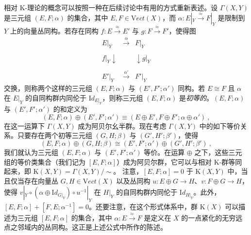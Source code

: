 \documentclass[11pt,a4paper]{ctexart}
\begin{document}
相对 K-理论的概念可以按照一种在后续讨论中有用的方式重新表述。设 \(\Gamma(X,Y)\) 是三元组 \((E,F;\alpha)\) 的集合，其中 \(E,F\in {\mathrm
Vect}(X)\)，而 \(\alpha: E|_{Y}\stackrel{\approx}{\rightarrow}F|_{Y}\) 是限制到 \(Y\) 上的向量丛同构。若存在同构 \(f: E\stackrel{\approx}{\rightarrow} E'\) 与 \(g:
F\stackrel{\approx}{\rightarrow}F'\)，使得图 \[{\begin{array}{ccc}
E|_{Y}&\stackrel{\alpha}{\longrightarrow}&F|_{Y}\\&
&\\{\scriptstyle f|_{Y}}\downarrow& &\downarrow{\scriptstyle g|_{Y}}\\&
&\\E'|_{Y}&\stackrel{\alpha'}{\longrightarrow}&F'|_{Y}\end{array}}\] 交换，则称两个这样的三元组 \((E,F;\alpha)\) 与 \((E',F';\alpha')\) 同构。若 \(E\cong F\) 且 \(\alpha\) 在 \(E|_{Y}\) 的自同构群内同伦于 \({\mathrm Id}_{E|_{Y}}\)，则称三元组 \((E,F;\alpha)\) 是\emph{初等的}。\((E,F;\alpha)\) 与 \((E',F';\alpha')\) 的和定义为 \[(E,F;\alpha)\oplus(E',F';\alpha')
\equiv(E\oplus E', F\oplus F'; \alpha\oplus\alpha')\ ,\] 在这一运算下 \(\Gamma(X,Y)\) 成为阿贝尔幺半群。现在考虑 \(\Gamma(X,Y)\) 中的如下等价关系。只要存在两个初等三元组 \((G,H;\beta)\) 与 \((G',H';\beta')\)，使得 \[(E,F;\alpha)\oplus(G,H;\beta)\cong(E',F';\alpha')\oplus(G',H';\beta')\ ,\] 我们就认为三元组 \((E,F;\alpha)\) 与 \((E',F';\alpha')\) 等价。在运算 \(\oplus\) 之下，这些三元组的等价类集合（我们记为 \([E,F;\alpha]\)）成为阿贝尔群，它可以与相对 K-群等同起来，即 \({\mathrm K}(X,Y)=\Gamma(X,Y)/\sim\)。 注意，\([E,F;\alpha]=0\) 于 \({\mathrm K}(X,Y)\) 中，当且仅当存在向量丛 \(G,H\in {\mathrm Vect}(X)\) 以及丛同构 \(u:E\oplus G
\rightarrow H\)、\(v: F\oplus G\rightarrow H\)，使得 \(v|_{Y}\circ
(\alpha\oplus {\mathrm Id}_{G|_{Y}})\circ u^{-1}|_{Y}\) 在 \(H|_{Y}\) 的自同构群内同伦于 \({\mathrm Id}_{H|_{Y}}\)。此外，\([E,F;\alpha]+[F,E;\alpha^{-1}]=0\)。还要注意，在这个形式体系中，群 \({\mathrm K}(X)\) 可以描述为三元组 \([E,F;\alpha]\) 的集合，其中 \(\alpha:E\stackrel{\approx}{\rightarrow} F\) 是定义在 \(X\) 的一点紧化的无穷远点之邻域内的丛同构。这正是上述公式中所作的陈述。
\end{document}
